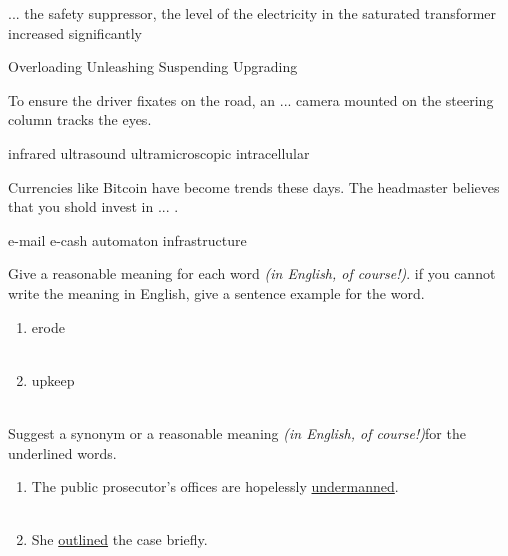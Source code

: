 \documentclass{exam}
\begin{document}
\begin{questions}
\question ... the safety suppressor, the level of the electricity in the saturated transformer increased significantly\\
\begin{oneparchoices}
\choice Overloading
 \correctchoice Unleashing
 \choice Suspending
 \choice Upgrading
\end{oneparchoices}
\question To ensure the driver fixates on the road, an ... camera mounted on the steering column tracks the eyes.\\
\begin{oneparchoices}
 \correctchoice infrared 
 \choice ultrasound
 \choice ultramicroscopic 
 \choice intracellular
\end{oneparchoices}

\question Currencies like Bitcoin have become trends these days. The headmaster believes that you shold invest in ... .\\
\begin{oneparchoices}
\choice e-mail
\correctchoice e-cash
\choice automaton
\choice infrastructure

\end{oneparchoices}
\question Give a reasonable meaning for each word \emph{(in English, of course!)}. if you cannot write the meaning in English, give a sentence example for the word.\\
\begin{enumerate}
	\item erode \\ \\ 
	\item upkeep \\ \\
\end{enumerate}
\question Suggest a synonym or a reasonable meaning \emph{(in English, of course!)}for the underlined words.\\
\begin{enumerate}
	\item The public prosecutor's offices are hopelessly \underline{undermanned}.\\ \\
	\item She \underline{outlined} the case briefly.\\\\
\end{enumerate}
\end{questions}
\end{document}
